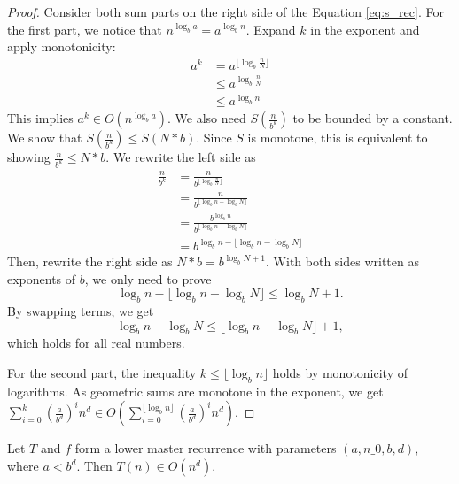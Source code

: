\begin{proof}
    Consider both sum parts on the right side of the Equation \ref{eq:s_rec}.
    For the first part, we notice that $n^{\log_b{a}} = a^{\log_b{n}}$.
    Expand $k$ in the exponent and apply monotonicity:
    \begin{align*}
        a^k &= a^{\lfloor \log_b{\frac{n}{N}} \rfloor} \\
            &\leq a^{\log_b{\frac{n}{N}}} \\
            &\leq a^{\log_b{n}}
    \end{align*}
    This implies $a^k \in O(n^{\log_b{a}})$. We also need $S(\frac{n}{b^k})$ to
    be bounded by a constant. We show that $S(\frac{n}{b^k}) \leq S(N*b)$.
    Since $S$ is monotone, this is equivalent to showing 
    $\frac{n}{b^k} \leq N*b$. We rewrite the left side as
    \begin{align*}
        \frac{n}{b^k} &= \frac{n}{b^{\lfloor \log_b{\frac{n}{N}} \rfloor}} \\
                      &= \frac{n}{b^{\lfloor \log_b{n} - \log_b{N} \rfloor}} \\
                      &= \frac{b^{\log_b{n}}}
                              {b^{\lfloor \log_b{n} - \log_b{N} \rfloor}} \\
                      &= b^{\log_b{n} - 
                            \lfloor \log_b{n} - \log_b{N} \rfloor}
    \end{align*}
    Then, rewrite the right side as $N*b = b^{\log_b{N} + 1}$. With both 
    sides written as exponents of $b$, we only need to prove
    \[\log_b{n} - \lfloor \log_b{n} - \log_b{N} \rfloor \leq \log_b{N} + 1.\]
    By swapping terms, we get
    \[\log_b{n} - \log_b{N} \leq \lfloor \log_b{n} - \log_b{N} \rfloor + 1,\]
    which holds for all real numbers. 

    For the second part, the inequality $k \leq \lfloor \log_b{n} \rfloor$ 
    holds by monotonicity of logarithms. As geometric sums are monotone in 
    the exponent, we get $\sum_{i=0}^k (\frac{a}{b^d})^i n^d \in 
    O(\sum_{i=0}^{\lfloor \log_b{n} \rfloor} (\frac{a}{b^d})^i n^d)$.
\end{proof}

\begin{theorem}
    \label{thm:big_o_of_lt}
    \leanok
    Let $T$ and $f$ form a lower master recurrence with parameters 
    $(a, n\_0, b, d)$, where $a < b^d$. Then $T(n) \in O(n^d)$.
\end{theorem}

